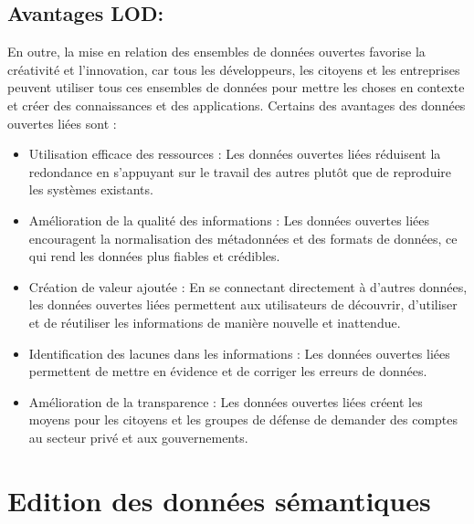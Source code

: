 \documentclass[12pt]{report}
\begin{document}
\subsection{Avantages LOD:}
En outre, la mise en relation des ensembles de données ouvertes favorise la créativité et l'innovation, car
tous les développeurs, les citoyens et les entreprises peuvent utiliser tous ces ensembles de données pour
mettre les choses en contexte et créer des connaissances et des applications.
Certains des avantages des données ouvertes liées sont :
\begin{itemize}
 \item Utilisation efficace des ressources : Les données ouvertes liées réduisent la redondance en s'appuyant sur
le travail des autres plutôt que de reproduire les systèmes existants.
\item Amélioration de la qualité des informations : Les données ouvertes liées encouragent la normalisation des
métadonnées et des formats de données, ce qui rend les données plus fiables et crédibles.
\item Création de valeur ajoutée : En se connectant directement à d'autres données, les données ouvertes liées
permettent aux utilisateurs de découvrir, d'utiliser et de réutiliser les informations de manière nouvelle et
inattendue.
\item Identification des lacunes dans les informations : Les données ouvertes liées permettent de mettre en
évidence et de corriger les erreurs de données.
\item Amélioration de la transparence : Les données ouvertes liées créent les moyens pour les citoyens et les
groupes de défense de demander des comptes au secteur privé et aux gouvernements.
\end{itemize}

\section{Edition des données sémantiques}
\end{document}
